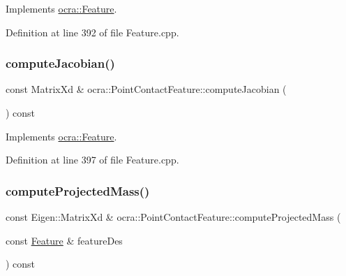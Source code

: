 Implements \hyperlink{classocra_1_1Feature_a4fb8eeeed978a1f727ec43cd1bd18d78}{ocra\+::\+Feature}.



Definition at line 392 of file Feature.\+cpp.

\hypertarget{classocra_1_1PointContactFeature_a969bbe345edbcf6abecdd863630faa3f}{}\label{classocra_1_1PointContactFeature_a969bbe345edbcf6abecdd863630faa3f} 
\subsubsection{\texorpdfstring{compute\+Jacobian()}{computeJacobian()}\hspace{0.1cm}{\footnotesize\ttfamily [2/2]}}
{\footnotesize\ttfamily const Matrix\+Xd \& ocra\+::\+Point\+Contact\+Feature\+::compute\+Jacobian (\begin{DoxyParamCaption}{ }\end{DoxyParamCaption}) const\hspace{0.3cm}{\ttfamily [virtual]}}



Implements \hyperlink{classocra_1_1Feature_adbab3b388657555abb805bb971c2491f}{ocra\+::\+Feature}.



Definition at line 397 of file Feature.\+cpp.

\hypertarget{classocra_1_1PointContactFeature_a3798f3cd3649bf2360876610f7a4cf7a}{}\label{classocra_1_1PointContactFeature_a3798f3cd3649bf2360876610f7a4cf7a} 
\subsubsection{\texorpdfstring{compute\+Projected\+Mass()}{computeProjectedMass()}\hspace{0.1cm}{\footnotesize\ttfamily [1/2]}}
{\footnotesize\ttfamily const Eigen\+::\+Matrix\+Xd \& ocra\+::\+Point\+Contact\+Feature\+::compute\+Projected\+Mass (\begin{DoxyParamCaption}\item[{const \hyperlink{classocra_1_1Feature}{Feature} \&}]{feature\+Des }\end{DoxyParamCaption}) const\hspace{0.3cm}{\ttfamily [virtual]}}



